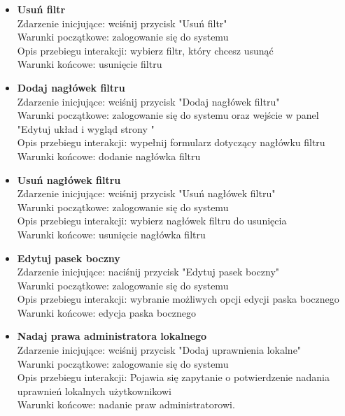 \documentclass{article}
\begin{document}
\begin{itemize}
	
	\item \textbf{Usuń filtr}
	\\Zdarzenie inicjujące: wciśnij przycisk "Usuń filtr"
	\\Warunki początkowe: zalogowanie się do systemu
	\\Opis przebiegu interakcji: wybierz filtr, który chcesz usunąć	
	\\Warunki końcowe: usunięcie filtru
	
	
	\item \textbf{Dodaj nagłówek filtru}
	\\Zdarzenie inicjujące: wciśnij przycisk "Dodaj nagłówek filtru"
	\\Warunki początkowe: zalogowanie się do systemu oraz wejście w panel "Edytuj układ i wygląd strony "
	\\Opis przebiegu interakcji: wypełnij formularz dotyczący nagłówku filtru
	\\Warunki końcowe: dodanie nagłówka filtru
	
	\item \textbf{Usuń nagłówek filtru}
	\\Zdarzenie inicjujące: wciśnij przycisk "Usuń nagłówek filtru"
	\\Warunki początkowe: zalogowanie się do systemu
	\\Opis przebiegu interakcji: wybierz nagłówek filtru do usunięcia
	\\Warunki końcowe: usunięcie nagłówka filtru
	

	
	\item \textbf{Edytuj pasek boczny}
	\\Zdarzenie inicjujące: naciśnij przycisk "Edytuj pasek boczny"
	\\Warunki początkowe: zalogowanie się do systemu
	\\Opis przebiegu interakcji: wybranie możliwych opcji edycji paska bocznego
	\\Warunki końcowe: edycja paska bocznego
	
	
	\item \textbf{Nadaj prawa administratora lokalnego}
	\\Zdarzenie inicjujące: wciśnij przycisk "Dodaj uprawnienia lokalne"
	\\Warunki początkowe: zalogowanie się do systemu
	\\Opis przebiegu interakcji: Pojawia się zapytanie o potwierdzenie nadania uprawnień lokalnych użytkownikowi
	\\Warunki końcowe: nadanie praw administratorowi.
	

\end{itemize}
\end{document}
